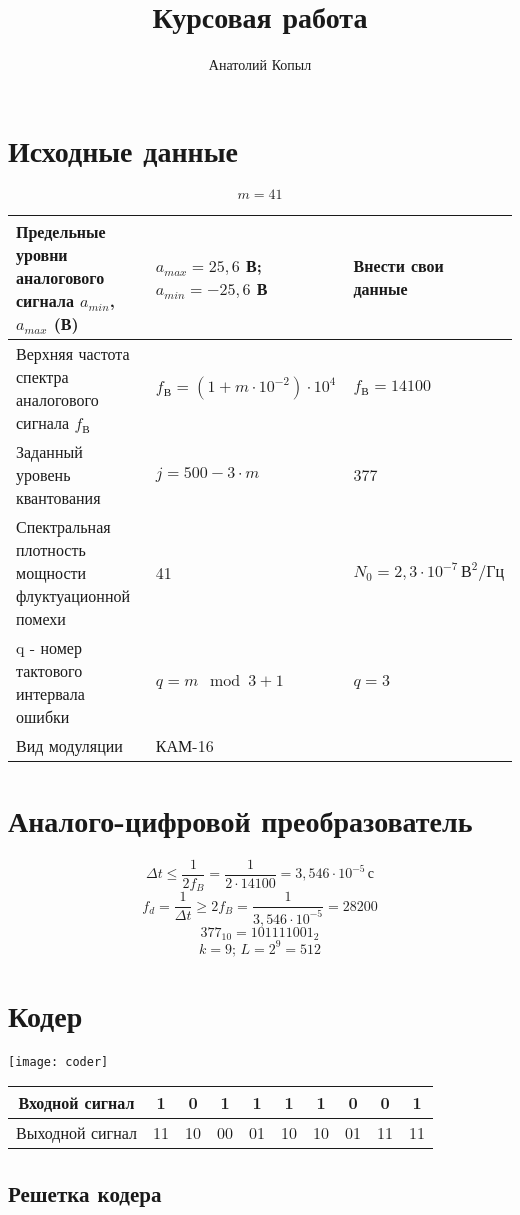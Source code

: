 \documentclass[a4paper, 12pt]{article}
\author{Анатолий Копыл}
\title{Курсовая работа}
\begin{document}
\section{Исходные данные}
\[ m=41 \]
\begin{center}
  \begin{tabular}{ | p{5cm} | p{5cm} | p{5cm} | } 
    \hline
    Предельные уровни аналогового сигнала \(a_{min}\), \(a_{max}\) (В) & \(a_{max}=25,6\) В;\newline\(a_{min}=-25,6\) В & Внести свои данные \\
    \hline
    Верхняя частота спектра аналогового сигнала \(f_В\) & \(f_В =(1+m\cdot 10^{-2})\cdot 10^4\) & \(f_В =14100\) \\ 
    \hline
    Заданный уровень квантования & \(j=500-3\cdot m\) & 377 \\
    \hline
    Спектральная плотность мощности флуктуационной помехи & 41 & \(N_0=2,3\cdot 10^{-7}\, В^2/Гц\)\\
    \hline
    q - номер тактового интервала ошибки & \(q=m\mod{3}+1\) & \(q=3\)\\
    \hline
    Вид модуляции & КАМ-16 & \\
    \hline
  \end{tabular}
\end{center}

\section{Аналого-цифровой преобразователь}
\[ \Delta t \leq \frac{1}{2f_B}=\frac1 {2\cdot 14100} = 3,546\cdot 10^{-5}\, с \]
\[ f_d=\frac{1}{\Delta t}\geq 2f_B=\frac{1}{3,546\cdot 10^{-5}}=28200 \]
\[ 377_{10}=101111001_2 \]
\[ k=9;\, L=2^9 = 512 \]

\section{Кодер}
\begin{center}
  \texttt{[image: coder]}

  \begin{tabular}{ | c | c | c | c | c | c | c | c | c | c | }
    \hline
    Входной сигнал &1&0&1&1&1&1&0&0&1\\
    \hline
    Выходной сигнал &11&10&00&01&10&10&01&11&11\\
    \hline
  \end{tabular}
\end{center}

\subsection{Решетка кодера}
\end{document}
